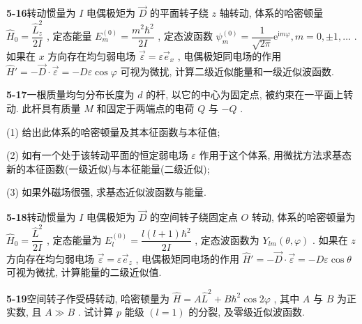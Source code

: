 \newpage

\textbf{5-16}\quad 转动惯量为 $\displaystyle I$ 电偶极矩为 $\displaystyle \vec{D}$ 的平面转子绕 $\displaystyle z$ 轴转动, 体系的哈密顿量 $\displaystyle \hat{H}_0 = \dfrac{\hat{L}_z^2}{2I}$ , 定态能量 $\displaystyle E_m^{(0)} = \dfrac{m^2\hbar^2}{2I}$ , 定态波函数 $\displaystyle \psi_m^{(0)} = \dfrac{1}{\sqrt{2\pi}}\mathrm{e}^{\mathrm{i}m\varphi}, m = 0, \pm 1, \dots$ . 如果在 $\displaystyle x$ 方向存在均匀弱电场 $\displaystyle \vec{\varepsilon} = \varepsilon \vec{e}_x$ , 电偶极矩同电场的作用 $\displaystyle \hat{H}' = -\vec{D} \cdot \vec{\varepsilon} = -D\varepsilon \cos \varphi$ 可视为微扰, 计算二级近似能量和一级近似波函数.

\vfill

\newpage

\textbf{5-17}\quad 一根质量均匀分布长度为 $\displaystyle d$ 的杆, 以它的中心为固定点, 被约束在一平面上转动. 此杆具有质量 $\displaystyle M$ 和固定于两端点的电荷 $\displaystyle Q$ 与 $\displaystyle -Q$ .

(1) 给出此体系的哈密顿量及其本征函数与本征值;

(2) 如有一个处于该转动平面的恒定弱电场 $\displaystyle \varepsilon$ 作用于这个体系, 用微扰方法求基态新的本征函数(一级近似)与本征能量(二级近似);

(3) 如果外磁场很强, 求基态近似波函数与能量.

\vfill

\newpage

\textbf{5-18}\quad 转动惯量为 $\displaystyle I$ 电偶极矩为 $\displaystyle \vec{D}$ 的空间转子绕固定点 $\displaystyle O$ 转动, 体系的哈密顿量为 $\displaystyle \hat{H}_0 = \dfrac{\hat{L}^2}{2I}$ , 定态能量为 $\displaystyle E_l^{(0)} = \dfrac{l(l + 1)\hbar^2}{2I}$ , 定态波函数为 $\displaystyle Y_{lm}(\theta, \varphi)$ . 如果在 $\displaystyle z$ 方向存在均匀弱电场 $\displaystyle \vec{\varepsilon} = \varepsilon \vec{e}_z$ , 电偶极矩同电场的作用 $\displaystyle \hat{H}' = -\vec{D} \cdot \vec{\varepsilon} = -D\varepsilon \cos \theta$ 可视为微扰, 计算能量的二级近似值.

\vfill

\newpage

\textbf{5-19}\quad 空间转子作受碍转动, 哈密顿量为 $\displaystyle \hat{H} = A\hat{L}^2 + B\hbar^2\cos 2\varphi$ , 其中 $\displaystyle A$ 与 $\displaystyle B$ 为正实数, 且 $\displaystyle A \gg B$ . 试计算 $\displaystyle p$ 能级 $\displaystyle (l = 1)$ 的分裂, 及零级近似波函数.

\vfill

\newpage

